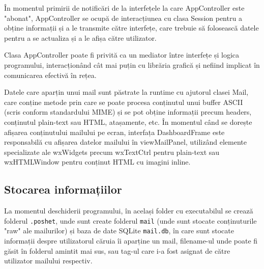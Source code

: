 \documentclass[runningheads]{llncs}
\begin{document}
În momentul primirii de notificări de la interfețele la care AppController este "abonat", AppController se ocupă de interacțiunea cu clasa Session pentru a obține informații și a le transmite către interfețe, care trebuie să folosească datele pentru a se actualiza și a le afișa către utilizator.

Clasa AppController poate fi privită ca un mediator între interfețe și logica programului, interacționând cât mai puțin cu librăria grafică și nefiind implicat în comunicarea efectivă în rețea.

Datele care aparțin unui mail sunt păstrate la runtime cu ajutorul clasei Mail, care conține metode prin care se poate procesa conținutul unui buffer ASCII (scris conform standardului MIME) și se pot obține informații precum headers, conținutul plain-text sau HTML, atașamente, etc. În momentul când se dorește afișarea conținutului mailului pe ecran, interfața DashboardFrame este responsabilă cu afișarea datelor mailului în viewMailPanel, utilizând elemente specializate ale wxWidgets precum wxTextCtrl pentru plain-text sau wxHTMLWindow pentru conținut HTML cu imagini inline.


\subsection{Stocarea informațiilor}

La momentul deschiderii programului, în același folder cu executabilul se crează folderul \texttt{.poshet}, unde sunt create folderul \texttt{mail} (unde sunt stocate conținuturile "raw" ale mailurilor) și baza de date SQLite \texttt{mail.db}, în care sunt stocate informații despre utilizatorul căruia îi aparține un mail,  filename-ul unde poate fi găsit în folderul amintit mai sus, sau tag-ul care i-a fost asignat de către utilizator mailului respectiv.
\end{document}
